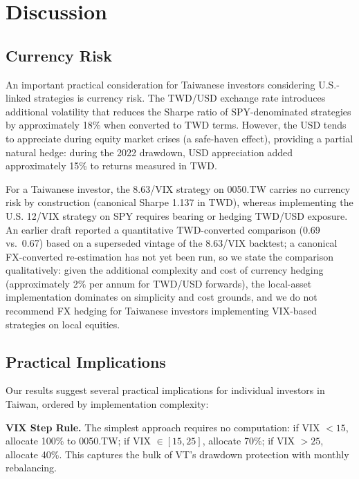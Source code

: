 
\section{Discussion}
\label{sec:discussion}

\subsection{Currency Risk}

An important practical consideration for Taiwanese investors considering U.S.-linked strategies is currency risk. The TWD/USD exchange rate introduces additional volatility that reduces the Sharpe ratio of SPY-denominated strategies by approximately 18\% when converted to TWD terms. However, the USD tends to appreciate during equity market crises (a safe-haven effect), providing a partial natural hedge: during the 2022 drawdown, USD appreciation added approximately 15\% to returns measured in TWD.

For a Taiwanese investor, the 8.63/VIX strategy on 0050.TW carries no currency risk by construction (canonical Sharpe 1.137 in TWD), whereas implementing the U.S. 12/VIX strategy on SPY requires bearing or hedging TWD/USD exposure. An earlier draft reported a quantitative TWD-converted comparison (0.69 vs.\ 0.67) based on a superseded vintage of the 8.63/VIX backtest; a canonical FX-converted re-estimation has not yet been run, so we state the comparison qualitatively: given the additional complexity and cost of currency hedging (approximately 2\% per annum for TWD/USD forwards), the local-asset implementation dominates on simplicity and cost grounds, and we do not recommend FX hedging for Taiwanese investors implementing VIX-based strategies on local equities.

\subsection{Practical Implications}

Our results suggest several practical implications for individual investors in Taiwan, ordered by implementation complexity:

\textbf{VIX Step Rule.} The simplest approach requires no computation: if VIX $< 15$, allocate 100\% to 0050.TW; if VIX $\in [15, 25]$, allocate 70\%; if VIX $> 25$, allocate 40\%. This captures the bulk of VT's drawdown protection with monthly rebalancing.

